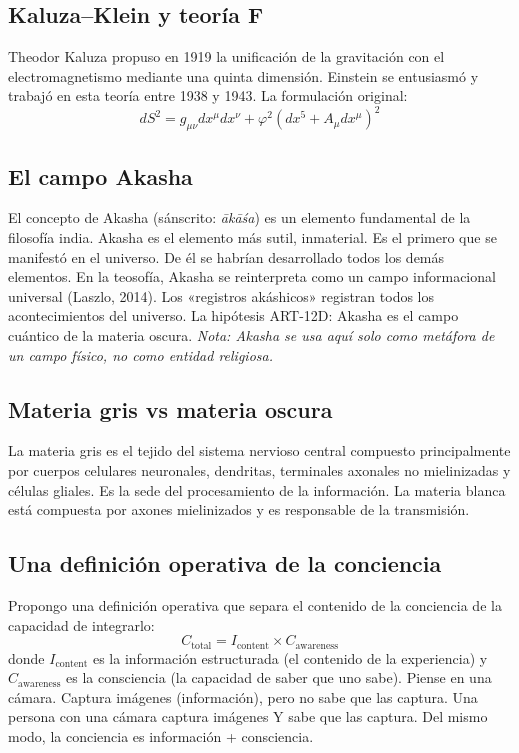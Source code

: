 \subsection{Kaluza--Klein y teoría F}
Theodor Kaluza propuso en 1919 la unificación de la gravitación con el electromagnetismo mediante una quinta dimensión. Einstein se entusiasmó y trabajó en esta teoría entre 1938 y 1943. La formulación original:
\begin{equation}
dS^2 = g_{\mu\nu} dx^\mu dx^\nu + \varphi^2(dx^5 + A_{\mu} dx^\mu)^2
\end{equation}

\subsection{El campo Akasha}
El concepto de Akasha (sánscrito: \emph{ākāśa}) es un elemento fundamental de la filosofía india. Akasha es el elemento más sutil, inmaterial. Es el primero que se manifestó en el universo. De él se habrían desarrollado todos los demás elementos. En la teosofía, Akasha se reinterpreta como un campo informacional universal (Laszlo, 2014). Los «registros akáshicos» registran todos los acontecimientos del universo. La hipótesis ART-12D: Akasha es el campo cuántico de la materia oscura. \textit{Nota: Akasha se usa aquí solo como metáfora de un campo físico, no como entidad religiosa.}

\subsection{Materia gris vs materia oscura}
La materia gris es el tejido del sistema nervioso central compuesto principalmente por cuerpos celulares neuronales, dendritas, terminales axonales no mielinizadas y células gliales. Es la sede del procesamiento de la información. La materia blanca está compuesta por axones mielinizados y es responsable de la transmisión.

\subsection{Una definición operativa de la conciencia}
Propongo una definición operativa que separa el contenido de la conciencia de la capacidad de integrarlo:
\begin{equation}
C_{\text{total}} = I_{\text{content}} \times C_{\text{awareness}}
\end{equation}
donde $I_{\text{content}}$ es la información estructurada (el contenido de la experiencia) y $C_{\text{awareness}}$ es la consciencia (la capacidad de saber que uno sabe). Piense en una cámara. Captura imágenes (información), pero no sabe que las captura. Una persona con una cámara captura imágenes Y sabe que las captura. Del mismo modo, la conciencia es información + consciencia.

